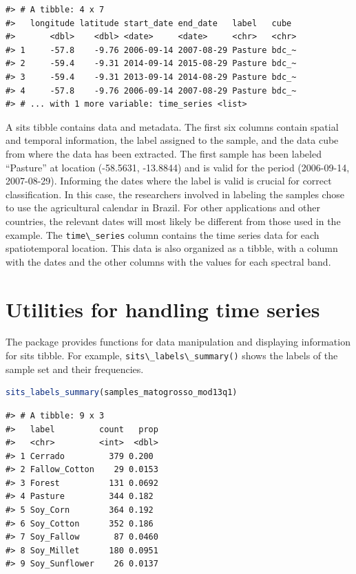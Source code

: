 \documentclass[
  11pt,
]{report}
\newcommand{\passthrough}[1]{#1}
\begin{document}
\begin{lstlisting}
#> # A tibble: 4 x 7
#>   longitude latitude start_date end_date   label   cube 
#>       <dbl>    <dbl> <date>     <date>     <chr>   <chr>
#> 1     -57.8    -9.76 2006-09-14 2007-08-29 Pasture bdc_~
#> 2     -59.4    -9.31 2014-09-14 2015-08-29 Pasture bdc_~
#> 3     -59.4    -9.31 2013-09-14 2014-08-29 Pasture bdc_~
#> 4     -57.8    -9.76 2006-09-14 2007-08-29 Pasture bdc_~
#> # ... with 1 more variable: time_series <list>
\end{lstlisting}

A sits tibble contains data and metadata. The first six columns contain
spatial and temporal information, the label assigned to the sample, and
the data cube from where the data has been extracted. The first sample
has been labeled ``Pasture'' at location (-58.5631, -13.8844) and is
valid for the period (2006-09-14, 2007-08-29). Informing the dates where
the label is valid is crucial for correct classification. In this case,
the researchers involved in labeling the samples chose to use the
agricultural calendar in Brazil. For other applications and other
countries, the relevant dates will most likely be different from those
used in the example. The \passthrough{\lstinline!time\_series!} column
contains the time series data for each spatiotemporal location. This
data is also organized as a tibble, with a column with the dates and the
other columns with the values for each spectral band.

\hypertarget{utilities-for-handling-time-series}{%
\section*{Utilities for handling time
series}\label{utilities-for-handling-time-series}}

The package provides functions for data manipulation and displaying
information for sits tibble. For example,
\passthrough{\lstinline!sits\_labels\_summary()!} shows the labels of
the sample set and their frequencies.

\begin{lstlisting}[language=R]
sits_labels_summary(samples_matogrosso_mod13q1)
\end{lstlisting}

\begin{lstlisting}
#> # A tibble: 9 x 3
#>   label         count   prop
#>   <chr>         <int>  <dbl>
#> 1 Cerrado         379 0.200 
#> 2 Fallow_Cotton    29 0.0153
#> 3 Forest          131 0.0692
#> 4 Pasture         344 0.182 
#> 5 Soy_Corn        364 0.192 
#> 6 Soy_Cotton      352 0.186 
#> 7 Soy_Fallow       87 0.0460
#> 8 Soy_Millet      180 0.0951
#> 9 Soy_Sunflower    26 0.0137
\end{lstlisting}
\end{document}
